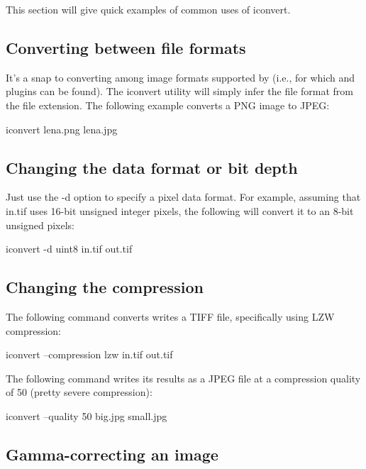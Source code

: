 This section will give quick examples of common uses of {\cf iconvert}.

\subsection*{Converting between file formats}

It's a snap to converting among image formats supported by \product
(i.e., for which \ImageInput and \ImageOutput plugins can be found).
The {\cf iconvert} utility will simply infer the file format from the
file extension. The following example converts a PNG image to JPEG:

\begin{code}
    iconvert lena.png lena.jpg
\end{code}

\subsection*{Changing the data format or bit depth}

Just use the {\cf -d} option to specify a pixel data format.  For
example, assuming that {\cf in.tif} uses 16-bit unsigned integer
pixels, the following will convert it to an 8-bit unsigned pixels:

\begin{code}
    iconvert -d uint8 in.tif out.tif
\end{code}

\subsection*{Changing the compression}

The following command converts writes a TIFF file, specifically using
LZW compression:

\begin{code}
    iconvert --compression lzw in.tif out.tif
\end{code}

The following command writes its results as a JPEG file at a 
compression quality of 50 (pretty severe compression):

\begin{code}
    iconvert --quality 50 big.jpg small.jpg
\end{code}

\subsection*{Gamma-correcting an image}

